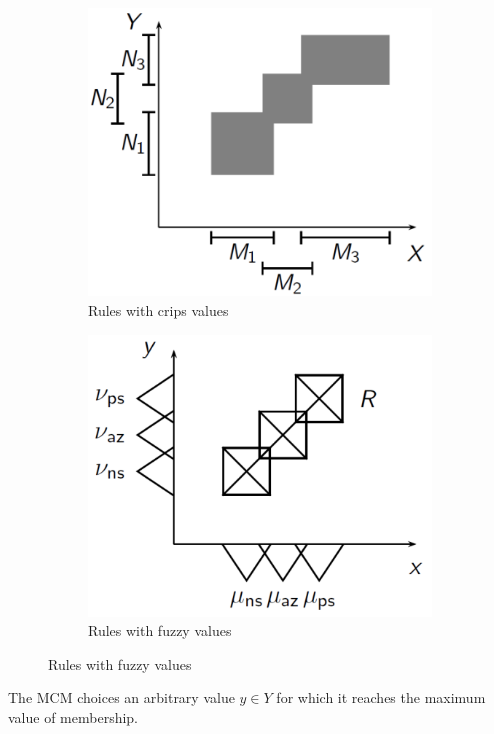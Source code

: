 \documentclass{article}
\begin{document}
\begin{figure}[H]
    \centering
    \hfill
    \begin{subfigure}[b]{0.4\textwidth}
        \centering
        \includegraphics[scale=0.3]{images/crisp-rules.png}
        \caption{Rules with crips values}
        \label{fig:crisp}
    \end{subfigure}
    \hfill
    \begin{subfigure}[b]{0.4\textwidth}
        \centering
        \includegraphics[scale=0.3]{images/fuzzy-rules.png}
        \caption{Rules with fuzzy values}
        \label{fig:fuz-val}
    \end{subfigure}
    \hfill
\end{figure}
The MCM choices an arbitrary value $y\in Y$ for which it reaches the maximum value of membership.
\end{document}
